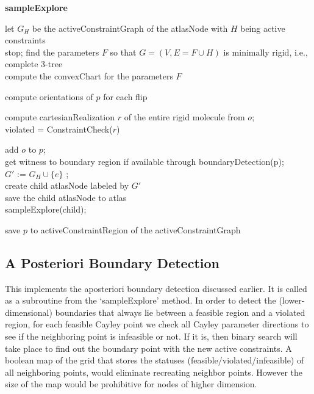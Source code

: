 \begin{algorithm} [htbp]

 {\bf sampleExplore}\\
 \BlankLine

	let $G_H$ be the activeConstraintGraph of the atlasNode with $H$ being active constraints\\
		{stop;	}
	find the parameters $F$ so that $G = (V, E = F\cup H)$ is minimally rigid, i.e., complete 3-tree\\
	compute the convexChart for the parameters $F$\\



	{
		compute orientations of $p$ for each flip\\

		{

			compute cartesianRealization $r$ of the entire rigid molecule from $o$;\\
			violated = ConstraintCheck($r$)
			{

				add $o$ to $p$;\\
				get witness to boundary region if available through boundaryDetection(p);\\
				{
					$G'$ := $G_H \cup \{e\}$ ;\\
					{
						create child atlasNode labeled by $G'$\\
						save the child atlasNode to atlas\\
						sampleExplore(child);\\
					}
				}
			}
		}

		save $p$ to activeConstraintRegion of the activeConstraintGraph\\
	}

	\caption{sampleExplore}
\label{alg:sampleExplore}
\end{algorithm}

\subsection{A Posteriori Boundary Detection}
This implements the aposteriori boundary detection discussed earlier.
It is called as a subroutine from the `sampleExplore' method. In
order to detect the (lower-dimensional) boundaries that always lie between a
feasible region and a violated region, for each feasible Cayley point we check
all Cayley parameter directions to see if the neighboring point is infeasible
or not. If it is, then binary search will take place to find out the
boundary point with the new active constraints. A boolean map of the grid that stores
the statuses (feasible/violated/infeasible) of all neighboring points, would
eliminate recreating neighbor points. However the size of the map would be
prohibitive for nodes of higher dimension.

